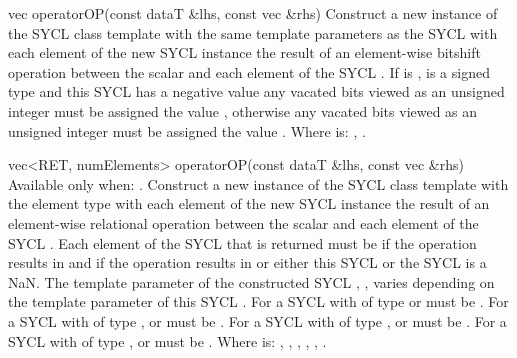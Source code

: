   \addRow
  {vec operatorOP(const dataT \&lhs, const vec \&rhs)}
  {
    Construct a new instance of the SYCL  class template with
    the same template parameters as the  SYCL 
    with each element of the new SYCL  instance the result of
    an element-wise  bitshift operation between the  scalar and each element of the  SYCL .
    If  is \codeinline{>>},  is a signed type
    and this SYCL  has a negative value any vacated bits viewed
    as an unsigned integer must be assigned the value , otherwise
    any vacated bits viewed as an unsigned integer must be assigned the value
    .
    \newline \newline
    Where  is: \codeinline{<<}, \codeinline{>>}.
  }

  \addRow
    {vec<RET, numElements> operatorOP(const dataT \&lhs, const vec \&rhs)}
    {
      Available only when: .
      \newline
      Construct a new instance of the SYCL  class template with
      the element type  with each element of the new SYCL
       instance the result of an element-wise 
      relational operation between the  scalar and each element
      of the  SYCL . Each element of the SYCL
       that is returned must be  if the operation
      results in  and  if the operation results
      in  or either this SYCL  or the
       SYCL  is a NaN.
      \newline \newline
      The  template parameter of the constructed SYCL
      , , varies depending on the  template parameter of this SYCL . For a SYCL
       with  of type  or
        must be . For a
      SYCL  with  of type ,  or  
      must be . For a SYCL  with
       of type ,  or
        must be . For a
      SYCL  with  of type ,  or  
      must be .
      \newline \newline
      Where  is: \codeinline{==}, \codeinline{!=}, \codeinline{<}, \codeinline{>}, \codeinline{<=}, \codeinline{>=}.
    }
    
